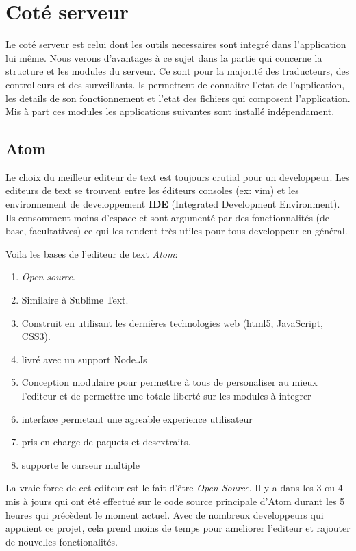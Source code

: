 \section{Coté serveur}
Le coté serveur est celui dont les outils necessaires sont integré dans l'application lui même. Nous verons d'avantages à ce sujet dans la partie qui concerne la structure et les modules du serveur. Ce sont pour la majorité des traducteurs, des controlleurs et des surveillants. ls permettent de connaitre l'etat de l'application, les details de son fonctionnement et l'etat des fichiers qui composent l'application.
Mis à part ces modules les applications suivantes sont installé indépendament.
\subsection{Atom}
Le choix du meilleur editeur de text est toujours crutial pour un developpeur. Les editeurs de text se trouvent entre les éditeurs consoles (ex: vim) et les environnement de developpement \textbf{IDE} (Integrated Development Environment). Ils consomment moins d'espace et sont argumenté par des fonctionnalités (de base, facultatives) ce qui les rendent très utiles pour tous developpeur en général.

Voila les bases de l'editeur de text \textit{Atom}:
\begin{enumerate}
	\item \textit{Open source}.
	\item Similaire à Sublime Text.
	\item Construit en utilisant les dernières technologies web (html5, JavaScript, CSS3).
	\item livré avec un support Node.Js
	\item Conception modulaire pour permettre à tous de personaliser au mieux l'editeur et de permettre une totale liberté sur les modules à integrer
	\item interface permetant une agreable experience utilisateur
	\item pris en charge de paquets et desextraits.
	\item supporte le curseur multiple
\end{enumerate}

La vraie force de cet editeur est le fait d'être \textit{Open Source}. Il y a dans les 3 ou 4 mis à jours qui ont été effectué sur le code source principale d'Atom durant les 5 heures qui précèdent le moment actuel. Avec de nombreux developpeurs qui appuient ce projet, cela prend moins de temps pour ameliorer l'editeur et rajouter de nouvelles fonctionalités.

